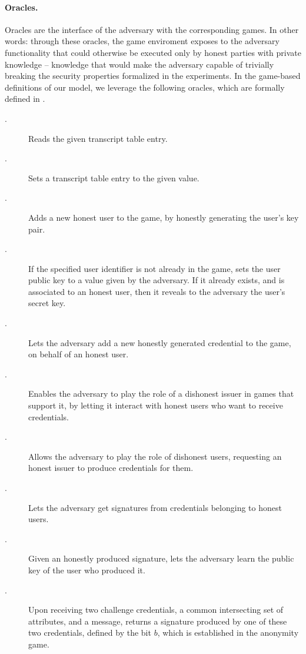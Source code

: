 \paragraph{Oracles.} %
Oracles are the interface of the adversary with the corresponding games. In
other words: through these oracles, the game enviroment exposes to the adversary
functionality that could otherwise be executed only by honest parties with
private knowledge -- knowledge that would make the adversary capable of
trivially breaking the security properties formalized in the experiments.
In the game-based definitions of our \GSAC model, we leverage the following
oracles, which are formally defined in .

\begin{description}
\item[\RREG.] Reads the given transcript table entry.
\item[\WREG.] Sets a transcript table entry to the given value.
\item[\HUGEN.] Adds a new honest user to the game, by honestly generating
  the user's key pair.
\item[\CUGEN.] If the specified user identifier is not already in the game,
  sets the user public key to a value given by the adversary. If it already
  exists, and is associated to an honest user, then it reveals to the adversary
  the user's secret key.
\item[\OBTISS.] Lets the adversary add a new honestly generated credential to
  the game, on behalf of an honest user.
\item[\OBTAIN.] Enables the adversary to play the role of a dishonest issuer
  in games that support it, by letting it interact with honest users who want to
  receive credentials.
\item[\ISSUE.] Allows the adversary to play the role of dishonest users,
  requesting an honest issuer to produce credentials for them.
\item[\SIGN.] Lets the adversary get signatures from credentials belonging
  to honest users.
\item[\OPEN.] Given an honestly produced signature, lets the adversary learn
  the public key of the user who produced it.
\item[\CHALb.] Upon receiving two challenge credentials, a common intersecting
  set of attributes, and a message, returns a signature produced by one of these
  two credentials, defined by the bit $b$, which is established in the anonymity
  game.
\end{description}

